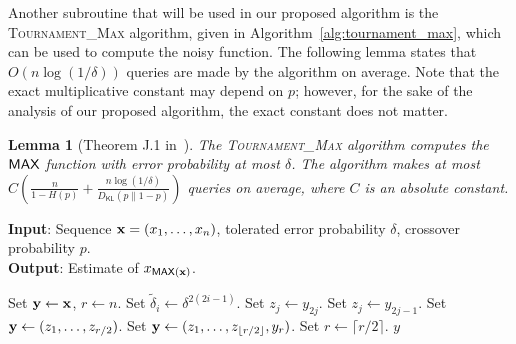 \documentclass[journal, onecolumn]{IEEEtran}
\theoremstyle{plain}
\newtheorem{lemma}[theorem]{Lemma}
\theoremstyle{definition}
\theoremstyle{remark}
\def\DKL{{D_\mathsf{KL}(p\|1-p)}}
\newcommand{\stourmax}{\textsc{Tournament\_Max }}
\begin{document}
Another subroutine that will be used in our proposed algorithm is the \stourmax algorithm, given in Algorithm~\ref{alg:tournament_max}, which can be used to compute the noisy \maxn function. The following lemma states that $O(n\log(1/\delta))$ queries are made by the algorithm on average. Note that the exact multiplicative constant may depend on $p$; however, for the sake of the analysis of our proposed algorithm, the exact constant does not matter.

\begin{lemma}[Theorem J.1 in~\citep{zhu2023optimal}] \label{lemma:tournament}
    The \stourmax algorithm computes the $\mathsf{MAX}$ function with error probability at most $\delta$. The algorithm makes at most $C\left(\frac{n}{1-H(p)}+\frac{n\log(1/\delta)}{\DKL}\right)$ queries on average, where $C$ is an absolute constant.
\end{lemma}

\begin{algorithm}[t]%
\caption{\stourmax algorithm for computing the noisy \maxn function}
\label{alg:tournament_max}
\textbf{Input}: Sequence ${\bf x} = (x_1,\ldots,x_n)$, tolerated error probability $\delta$, crossover probability $p$.\\
\textbf{Output}: Estimate of $x_{\mathsf{MAX}({\bf x})}$.
\begin{algorithmic}[1]
\State Set ${\bf y} \gets {\bf x}$, $r \gets n$.
    \State Set $\tilde\delta_i \gets \delta^{2(2i-1)}$.
            \State Set $z_j \gets y_{2j}$.
        \Else
            \State Set $z_j \gets y_{2j-1}$.
        \EndIf
    \EndFor
        \State Set ${\bf y} \gets (z_1, \ldots, z_{r/2})$.
    \Else
        \State Set ${\bf y} \gets (z_1, \ldots, z_{\lfloor r/2\rfloor}, y_r)$.
    \EndIf
    \State Set $r\gets \lceil r/2 \rceil$.
\EndFor
\State \Return $y$
\end{algorithmic}
\end{algorithm}
\end{document}
